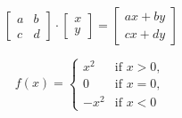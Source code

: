 \documentclass{article}
\begin{document}
\[
  \begin{bmatrix}
    a & b \\
    c & d
  \end{bmatrix}
  \cdot
  \begin{bmatrix}
    x \\
    y
  \end{bmatrix}
  =
  \begin{bmatrix}
    ax+by \\
    cx+dy
  \end{bmatrix}
\]

\[
  f(x)=
  \begin{cases}
    x^2  & \text{if } x>0, \\
    0    & \text{if } x=0, \\
    -x^2 & \text{if } x<0
  \end{cases}
\]
\end{document}
